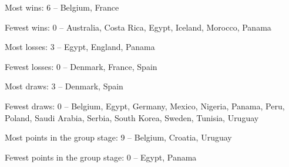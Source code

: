 \begin{questions}
\begin{solution}

Most wins: 6 – Belgium, France

Fewest wins: 0 – Australia, Costa Rica, Egypt, Iceland, Morocco, Panama

Most losses: 3 – Egypt, England, Panama

Fewest losses: 0 – Denmark, France, Spain

Most draws: 3 – Denmark, Spain

Fewest draws: 0 – Belgium, Egypt, Germany, Mexico, Nigeria, Panama, Peru, Poland, Saudi Arabia, Serbia, South Korea, Sweden, Tunisia, Uruguay

Most points in the group stage: 9 – Belgium, Croatia, Uruguay

Fewest points in the group stage: 0 – Egypt, Panama

\end{solution}
\end{questions}
